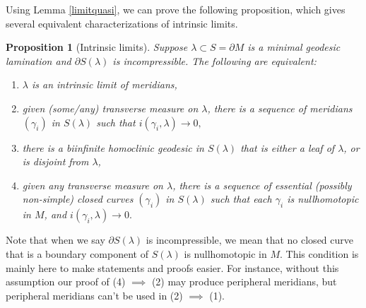 \documentclass[12pt]{amsart}
\newtheorem{prop}[theorem]{Proposition}
\theoremstyle{definition}
\theoremstyle{remark}
\begin{document}
Using Lemma \ref{limitquasi},  we can prove the following proposition, which gives several equivalent characterizations  of intrinsic limits. 

\begin {prop}[Intrinsic limits]\label {intrinsiclimits}
 Suppose $\lambda\subset S=\partial M$ is a minimal geodesic lamination and $\partial S(\lambda)$  is incompressible.  The following are equivalent:
\begin {enumerate}
\item  $\lambda $ is an  {intrinsic limit of  meridians},
\item  given (some/any)  transverse measure on $\lambda $, there is a sequence of meridians $(\gamma_i)$  in $S(\lambda)$ such that $i(\gamma_i,\lambda)\to 0,$ 
\item there is a biinfinite homoclinic geodesic in $S(\lambda) $  that is either a leaf of $\lambda$, or is disjoint from $\lambda$,
\item  given any  transverse measure on $\lambda $, there is a sequence of  essential (possibly non-simple) closed curves $(\gamma_i)$  in $S(\lambda)$  such that each $\gamma_i $ is nullhomotopic  in $M$, and $i(\gamma_i,\lambda)\to 0.$
\end {enumerate}
\end {prop}

Note that when we say $\partial S(\lambda)$ is incompressible, we mean that no closed curve that is a {boundary component} of $S(\lambda)$ is nullhomotopic in $M$. This condition is mainly here to make statements and proofs easier. For instance, without this assumption our proof of (4) $\implies$ (2) may produce peripheral meridians, but peripheral meridians can't be used in (2) $\implies$ (1).
\end{document}
